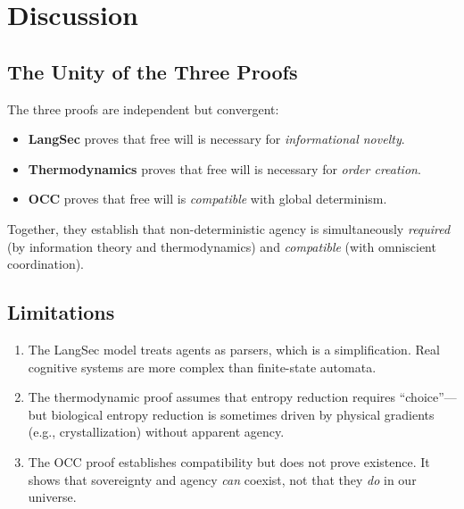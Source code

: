 \documentclass[12pt, a4paper]{article}
\theoremstyle{plain}
\theoremstyle{definition}
\theoremstyle{remark}
\begin{document}
\section{Discussion}\label{sec:discussion}

\subsection{The Unity of the Three Proofs}

The three proofs are independent but convergent:
\begin{itemize}
  \item \textbf{LangSec} proves that free will is necessary for
    \emph{informational novelty}.
  \item \textbf{Thermodynamics} proves that free will is necessary for
    \emph{order creation}.
  \item \textbf{OCC} proves that free will is \emph{compatible} with
    global determinism.
\end{itemize}

Together, they establish that non-deterministic agency is simultaneously
\emph{required} (by information theory and thermodynamics) and
\emph{compatible} (with omniscient coordination).

\subsection{Limitations}

\begin{enumerate}
  \item The LangSec model treats agents as parsers, which is a simplification.
    Real cognitive systems are more complex than finite-state automata.
  \item The thermodynamic proof assumes that entropy reduction requires
    ``choice''---but biological entropy reduction is sometimes driven by
    physical gradients (e.g., crystallization) without apparent agency.
  \item The OCC proof establishes compatibility but does not prove existence.
    It shows that sovereignty and agency \emph{can} coexist, not that they
    \emph{do} in our universe.
\end{enumerate}

\end{document}
